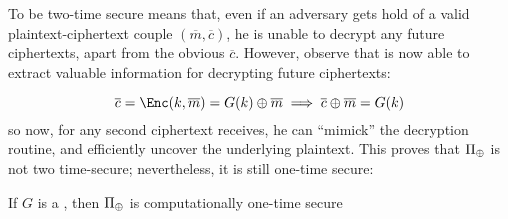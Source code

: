 To be two-time secure means that, even if an adversary \adversary{} gets hold of a valid plaintext-ciphertext couple $(\overline{m}, \overline{c})$, he is unable to decrypt any future ciphertexts\footnotemark, apart from the obvious $\overline{c}$. However, observe that \adversary{} is now able to extract valuable information for decrypting future ciphertexts:


\[
    \overline{c} = \Enc(k, \overline{m}) = G(k) \xor \overline{m} \implies \overline{c} \xor \overline{m} = G(k)
\]
so now, for any second ciphertext \adversary{} receives, he can ``mimick'' the decryption routine, and efficiently uncover the underlying plaintext. This proves that $\Pi_\oplus$ is not two time-secure; nevertheless, it is still one-time secure:

\begin{theorem}
    If $G$ is a \prg, then $\Pi_\oplus$ is computationally one-time secure
\end{theorem}

